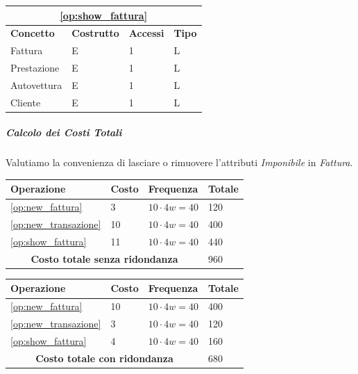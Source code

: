 					\begin{tabular}{| p{3cm} | p{3cm} | p{3cm} | p{3cm} |}
						\hline
						\multicolumn{4}{|c|}{\textbf{\ref{op:show_fattura}}} \\ \hline
						\textbf{Concetto} & \textbf{Costrutto} & \textbf{Accessi} & \textbf{Tipo} \\ \hline
						Fattura & E & 1 & L \\
						Prestazione & E & 1 & L \\
						Autovettura & E & 1 & L \\
						Cliente & E & 1 & L \\
						\hline
					\end{tabular}
					\vspace{2ex}

				\subparagraph{Calcolo dei Costi Totali}
					Valutiamo la convenienza di lasciare o rimuovere l'attributi \emph{Imponibile} in \emph{Fattura}.

					\vspace{2ex}
					\begin{tabular}{| p{3cm} | p{3cm} | p{3cm} | p{3cm} |}
						\hline
						\textbf{Operazione} & \textbf{Costo} & \textbf{Frequenza} & \textbf{Totale} \\ \hline
						\ref{op:new_fattura} & 3 & $10 \cdot 4w = 40$ & 120 \\
						\ref{op:new_transazione} & 10 & $10 \cdot 4w = 40$ & 400 \\
						\ref{op:show_fattura} & 11 & $10 \cdot 4w = 40$ & 440 \\
						\hline
						\multicolumn{3}{|c|}{\textbf{Costo totale senza ridondanza}} & 960 \\
						\hline
					\end{tabular}

					\begin{tabular}{| p{3cm} | p{3cm} | p{3cm} | p{3cm} |}
						\hline
						\textbf{Operazione} & \textbf{Costo} & \textbf{Frequenza} & \textbf{Totale} \\ \hline
						\ref{op:new_fattura} & 10 & $10 \cdot 4w = 40$ & 400 \\
						\ref{op:new_transazione} & 3 & $10 \cdot 4w = 40$ & 120 \\
						\ref{op:show_fattura} & 4 & $10 \cdot 4w = 40$ & 160 \\
						\hline
						\multicolumn{3}{|c|}{\textbf{Costo totale con ridondanza}} & 680 \\
						\hline

					\end{tabular}
					\vspace{2ex}

